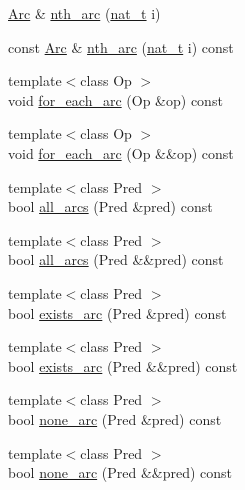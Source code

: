\begin{DoxyCompactItemize}
\item 
\hyperlink{namespace_designar_a3f55fb5513d62ff47cbc8f72b8e95d6f}{Arc} \& \hyperlink{class_designar_1_1_base_graph_a205d350fd588082a84d7a114ffd7cf5e}{nth\+\_\+arc} (\hyperlink{namespace_designar_aa72662848b9f4815e7bf31a7cf3e33d1}{nat\+\_\+t} i)
\item 
const \hyperlink{namespace_designar_a3f55fb5513d62ff47cbc8f72b8e95d6f}{Arc} \& \hyperlink{class_designar_1_1_base_graph_aaff3c76e0e0094d4ec1eaecd155ca951}{nth\+\_\+arc} (\hyperlink{namespace_designar_aa72662848b9f4815e7bf31a7cf3e33d1}{nat\+\_\+t} i) const
\item 
{\footnotesize template$<$class Op $>$ }\\void \hyperlink{class_designar_1_1_base_graph_ac46a1a7517a6c7029c6bae23d480cfa9}{for\+\_\+each\+\_\+arc} (Op \&op) const
\item 
{\footnotesize template$<$class Op $>$ }\\void \hyperlink{class_designar_1_1_base_graph_ae76905d5baebd62d0fc481efc7c20f66}{for\+\_\+each\+\_\+arc} (Op \&\&op) const
\item 
{\footnotesize template$<$class Pred $>$ }\\bool \hyperlink{class_designar_1_1_base_graph_a3e2a55dafde6b1edf42f88f4c7d066b8}{all\+\_\+arcs} (Pred \&pred) const
\item 
{\footnotesize template$<$class Pred $>$ }\\bool \hyperlink{class_designar_1_1_base_graph_aea71a873faf7e92195d582b21d14c347}{all\+\_\+arcs} (Pred \&\&pred) const
\item 
{\footnotesize template$<$class Pred $>$ }\\bool \hyperlink{class_designar_1_1_base_graph_aaed186c42ed6b51f761cda959ecde601}{exists\+\_\+arc} (Pred \&pred) const
\item 
{\footnotesize template$<$class Pred $>$ }\\bool \hyperlink{class_designar_1_1_base_graph_aebf517d972db553b03f2c4dbe4228d79}{exists\+\_\+arc} (Pred \&\&pred) const
\item 
{\footnotesize template$<$class Pred $>$ }\\bool \hyperlink{class_designar_1_1_base_graph_a023f28dd8824ba7a0c26342effd0fddf}{none\+\_\+arc} (Pred \&pred) const
\item 
{\footnotesize template$<$class Pred $>$ }\\bool \hyperlink{class_designar_1_1_base_graph_a69c4841b8c517a510d738bc1204da7b7}{none\+\_\+arc} (Pred \&\&pred) const
\item 

\end{DoxyCompactItemize}
